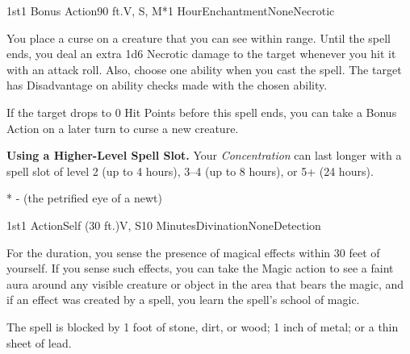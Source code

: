 
\begin{Spell}{1st}{1 Bonus Action}{90 ft.}{V, S, M*}{1 Hour}{Enchantment}{None}{Necrotic}

You place a curse on a creature that you can see within range. Until the spell ends, you deal an extra 1d6 Necrotic damage to the target whenever you hit it with an attack roll. Also, choose one ability when you cast the spell. The target has Disadvantage on ability checks made with the chosen ability.

If the target drops to 0 Hit Points before this spell ends, you can take a Bonus Action on a later turn to curse a new creature.

\textbf{Using a Higher-Level Spell Slot.} Your \textit{Concentration} can last longer with a spell slot of level 2 (up to 4 hours), 3–4 (up to 8 hours), or 5+ (24 hours).

* - (the petrified eye of a newt)

\end{Spell}

\begin{Spell}{1st}{1 Action}{Self (30 ft.)}{V, S}{10 Minutes}{Divination}{None}{Detection}

For the duration, you sense the presence of magical effects within 30 feet of yourself. If you sense such effects, you can take the Magic action to see a faint aura around any visible creature or object in the area that bears the magic, and if an effect was created by a spell, you learn the spell's school of magic.

The spell is blocked by 1 foot of stone, dirt, or wood; 1 inch of metal; or a thin sheet of lead.
\end{Spell}

